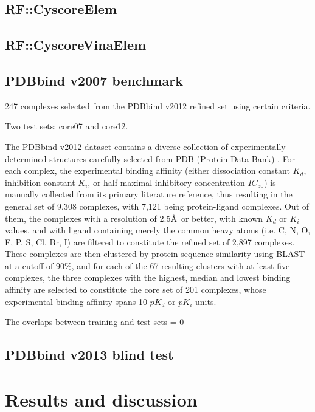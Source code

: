 \documentclass[journal=jacsat,manuscript=article]{achemso}
\begin{document}
\subsection{RF::CyscoreElem}

\subsection{RF::CyscoreVinaElem}

\subsection{PDBbind v2007 benchmark}

247 complexes selected from the PDBbind v2012 refined set using certain criteria.

Two test sets: core07 and core12.

The PDBbind v2012 dataset contains a diverse collection of experimentally determined structures carefully selected from PDB (Protein Data Bank) \cite{540,537}. For each complex, the experimental binding affinity (either dissociation constant $K_d$, inhibition constant $K_i$, or half maximal inhibitory concentration $IC_{50}$) is manually collected from its primary literature reference, thus resulting in the general set of 9,308 complexes, with 7,121 being protein-ligand complexes. Out of them, the complexes with a resolution of 2.5\AA\ or better, with known $K_d$ or $K_i$ values, and with ligand containing merely the common heavy atoms (i.e. C, N, O, F, P, S, Cl, Br, I) are filtered to constitute the refined set of 2,897 complexes. These complexes are then clustered by protein sequence similarity using BLAST at a cutoff of 90\%, and for each of the 67 resulting clusters with at least five complexes, the three complexes with the highest, median and lowest binding affinity are selected to constitute the core set of 201 complexes, whose experimental binding affinity spans 10 $pK_d$ or $pK_i$ units.

The overlaps between training and test sets = 0

\subsection{PDBbind v2013 blind test}


\section{Results and discussion}
\end{document}
